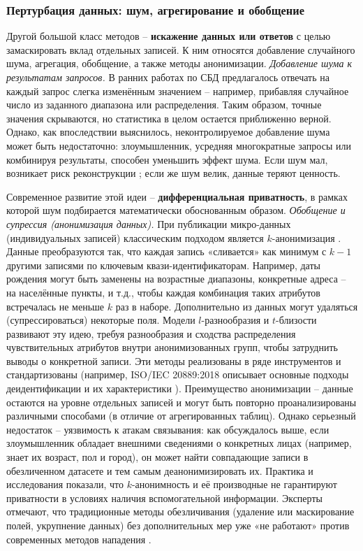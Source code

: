 \subsubsection{Пертурбация данных: шум, агрегирование и обобщение}

Другой большой класс методов – \textbf{искажение данных или ответов} с целью замаскировать вклад отдельных записей. К
ним относятся добавление случайного шума, агрегация, обобщение, а также методы анонимизации. \textit{Добавление шума к
результатам запросов.} В ранних работах по СБД предлагалось отвечать на каждый запрос слегка изменённым значением –
например, прибавляя случайное число из заданного диапазона или распределения. Таким образом, точные значения скрываются,
но статистика в целом остается приближенно верной. Однако, как впоследствии выяснилось, неконтролируемое добавление шума
может быть недостаточно: злоумышленник, усредняя многократные запросы или комбинируя результаты, способен уменьшить
эффект шума. Если шум мал, возникает риск реконструкции \autocite{differentialprivacy-org} ; если же шум велик, данные
теряют ценность.

Современное развитие этой идеи – \textbf{дифференциальная приватность}, в рамках которой шум
подбирается математически обоснованным образом. \textit{Обобщение и супрессия (анонимизация
данных).} При публикации микро-данных (индивидуальных записей) классическим подходом является $k$-анонимизация \autocite{sweeney2002kanon}. Данные
преобразуются так, что каждая запись «сливается» как минимум с $k-1$ другими записями по ключевым квази-идентификаторам.
Например, даты рождения могут быть заменены на возрастные диапазоны, конкретные адреса – на населённые пункты, и т.д.,
чтобы каждая комбинация таких атрибутов встречалась не меньше $k$ раз в наборе. Дополнительно из данных могут удаляться
(супрессироваться) некоторые поля. Модели $l$-разнообразия и $t$-близости развивают эту идею, требуя разнообразия и
сходства распределения чувствительных атрибутов внутри анонимизованных групп, чтобы затруднить выводы о конкретной
записи. Эти методы реализованы в ряде инструментов и стандартизованы (например, ISO/IEC 20889:2018 описывает основные
подходы деидентификации и их характеристики \autocite{ISO-IEC-20889-2018} ). Преимущество анонимизации – данные остаются
на уровне отдельных записей и могут быть повторно проанализированы различными способами (в отличие от агрегированных
таблиц). Однако серьезный недостаток – уязвимость к атакам связывания: как обсуждалось выше, если злоумышленник обладает
внешними сведениями о конкретных лицах (например, знает их возраст, пол и город), он может найти совпадающие записи в
обезличенном датасете и тем самым деанонимизировать их. Практика и исследования показали, что $k$-анонимность и её
производные не гарантируют приватности в условиях наличия вспомогательной информации. Эксперты отмечают, что
традиционные методы обезличивания (удаление или маскирование полей, укрупнение данных) без дополнительных мер уже «не
работают» против современных методов нападения \autocite{cornell-edu}.


